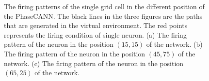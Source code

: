 \documentclass[final,5p,times,twocolumn]{elsarticle}
\begin{document}
\begin{figure}[!t]
	\subfigcapskip=-10pt %
	\centering
	\hspace{-8mm}
	\hspace{-8mm}
	\caption{The firing patterns of the single grid cell in the different position of the PhaseCANN. The black lines in the three figures are the paths that are generated in the virtual environment. The red points represents the firing condition of single neuron. (a) The firing pattern of the neuron in the position $(15,15)$ of the network. (b) The firing pattern of the neuron in the position $(45,75)$ of the network. (c) The firing pattern of the neuron in the position $(65,25)$ of the network.}
	\label{fig:single_neuron_firing}
\end{figure}
\end{document}
